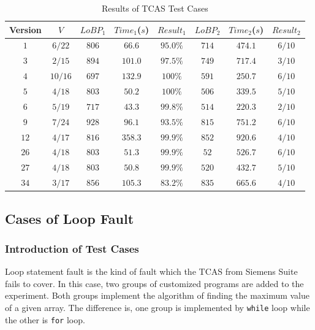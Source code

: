 \begin{table}
\small
\center
\caption{Results of TCAS Test Cases}
\label{table:RoTCASTC}
\begin{tabular}{|c|c|c|c|c|c|c|c|}
\hline
Version & $V$     & $LoBP_{1}$ & $Time_{1}$($s$) & $Result_{1}$ &$LoBP_{2}$ & $Time_{2}$($s$) & $Result_{2}$ \\
\hline
$1$     & $6/22$  & $806$      & $66.6$          & $95.0\%$     & $714$     & $474.1$         & $6/10$       \\
\hline
$3$     & $2/15$  & $894$      & $101.0$         & $97.5\%$     & $749$     & $717.4$         & $3/10$       \\
\hline
$4$	    & $10/16$ & $697$      & $132.9$         & $100\%$      & $591$     & $250.7$         & $6/10$       \\
\hline
$5$	    & $4/18$  & $803$      & $50.2$          & $100\%$      & $506$     & $339.5$         & $5/10$       \\
\hline
$6$	    & $5/19$  & $717$      & $43.3$          & $99.8\%$     & $514$     & $220.3$         & $2/10$       \\
\hline
$9$	    & $7/24$  & $928$      & $96.1$          & $93.5\%$     & $815$     & $751.2$         & $6/10$       \\
\hline
$12$    & $4/17$  & $816$      & $358.3$         & $99.9\%$     & $852$     & $920.6$         & $4/10$       \\
\hline
$26$    & $4/18$  & $803$      & $51.3$          & $99.9\%$     & $52$      & $526.7$         & $6/10$       \\
\hline
$27$    & $4/18$  & $803$      & $50.8$          & $99.9\%$     & $520$     & $432.7$         & $5/10$       \\
\hline
$34$    & $3/17$  & $856$      & $105.3$         & $83.2\%$     & $835$     & $665.6$         & $4/10$       \\
\hline
\end{tabular}
\end{table}

\subsection{Cases of Loop Fault}
\subsubsection{Introduction of Test Cases}
Loop statement fault is the kind of fault which the TCAS from Siemens Suite fails to cover.
In this case, two groups of customized programs are added to the experiment. Both groups implement the algorithm of finding the maximum value of a given array.
The difference is, one group is implemented by \lstinline|while| loop while the other is \lstinline|for| loop.

